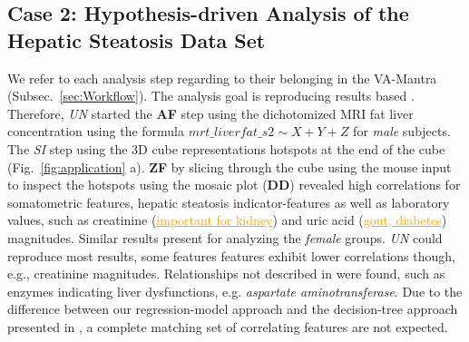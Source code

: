 \documentclass[journal]{style/vgtc} 			          %
\newcommand{\com}[1]{\textcolor{orange}{\uline{#1}}}
\begin{document}
\subsection{Case 2: Hypothesis-driven Analysis of the Hepatic Steatosis Data Set}
We refer to each analysis step regarding to their belonging in the VA-Mantra (Subsec.~\ref{sec:Workflow}).
The analysis goal is reproducing results based \cite{Niemann2014}.
Therefore, \emph{UN} started the \textbf{AF} step using the dichotomized MRI fat liver concentration using the formula $mrt\_liverfat\_s2 \sim X + Y + Z$ for \emph{male} subjects.
The \emph{SI} step using the 3D cube representations hotspots at the end of the cube (Fig.~\ref{fig:application} a).
\textbf{ZF} by slicing through the cube using the mouse input to inspect the hotspots using the mosaic plot (\textbf{DD}) revealed high correlations for somatometric features, hepatic steatosis indicator-features as well as laboratory values, such as creatinine (\com{important for kidney}) and uric acid (\com{gout, diabetes}) magnitudes.
Similar results present for analyzing the \emph{female} groups.
\emph{UN} could reproduce most results, some features features exhibit lower correlations though, e.g., creatinine magnitudes.
Relationships not described in \cite{Niemann2014} were found, such as enzymes indicating liver dysfunctions, e.g. \emph{aspartate aminotransferase}.
Due to the difference between our regression-model approach and the decision-tree approach presented in \cite{Niemann2014}, a complete matching set of correlating features are not expected.
\end{document}
